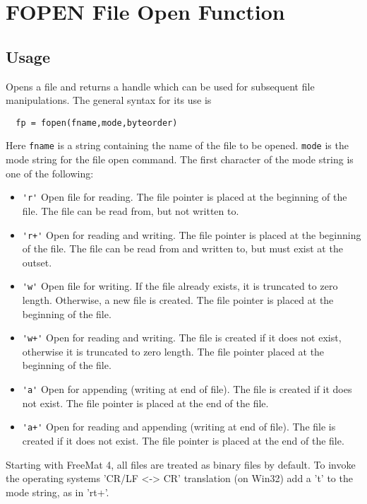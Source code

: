 \section{FOPEN File Open Function}

\subsection{Usage}

Opens a file and returns a handle which can be used for subsequent
file manipulations.  The general syntax for its use is
\begin{verbatim}
  fp = fopen(fname,mode,byteorder)
\end{verbatim}
Here \verb|fname| is a string containing the name of the file to be 
opened.  \verb|mode| is the mode string for the file open command.
The first character of the mode string is one of the following:
\begin{itemize}
\item  \verb|'r'|  Open  file  for  reading.  The file pointer is placed at
          the beginning of the file.  The file can be read from, but
	  not written to.

\item  \verb|'r+'|   Open for reading and writing.  The file pointer is
          placed at the beginning of the file.  The file can be read
	  from and written to, but must exist at the outset.

\item  \verb|'w'|    Open file for writing.  If the file already exists, it is
          truncated to zero length.  Otherwise, a new file is
	  created.  The file pointer is placed at the beginning of
	  the file.

\item  \verb|'w+'|   Open for reading and writing.  The file is created  if  
          it  does not  exist, otherwise it is truncated to zero
	  length.  The file pointer placed at the beginning of the file.

\item  \verb|'a'|    Open for appending (writing at end of file).  The file  is  
          created  if it does not exist.  The file pointer is placed at
	  the end of the file.

\item  \verb|'a+'|   Open for reading and appending (writing at end of file).   The
          file  is created if it does not exist.  The file pointer is
	  placed at the end of the file.

\end{itemize}
Starting with FreeMat 4, all files are treated as binary files by default.
To invoke the operating systems 'CR/LF <-> CR' translation (on Win32)
add a 't' to the mode string, as in 'rt+'.

